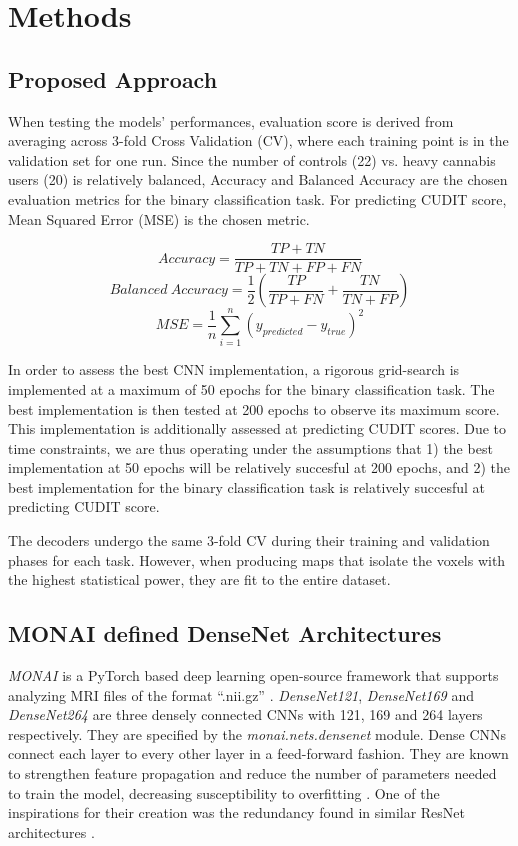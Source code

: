 \documentclass[conference]{IEEEtran}
\begin{document}
\section{Methods}

\subsection{Proposed Approach
}

When testing the models' performances, evaluation score is derived from averaging across 3-fold Cross Validation (CV), where each training point is in the validation set for one run. Since the number of controls (22) vs. heavy cannabis users (20) is relatively balanced, Accuracy and Balanced Accuracy are the chosen evaluation metrics for the binary classification task. For predicting CUDIT score, Mean Squared Error (MSE) is the chosen metric.

\[Accuracy = \frac{TP + TN}{TP + TN + FP + FN} \]
\[Balanced\ Accuracy = \frac{1}{2}(\frac{TP}{TP + FN} + \frac{TN}{TN + FP}) \]
\[MSE = \frac{1}{n}\sum_{i=1}^{n}(y_{predicted} - y_{true})^{2} \]

In order to assess the best CNN implementation, a rigorous grid-search is implemented at a maximum of 50 epochs for the binary classification task. The best implementation is then tested at 200 epochs to observe its maximum score. This implementation is additionally assessed at predicting CUDIT scores. Due to time constraints, we are thus operating under the assumptions that 1) the best implementation at 50 epochs will be relatively succesful at 200 epochs, and 2) the best implementation for the binary classification task is relatively succesful at predicting CUDIT score. 

The decoders undergo the same 3-fold CV during their training and validation phases for each task. However, when producing maps that isolate the voxels with the highest statistical power, they are fit to the entire dataset. 



\subsection{MONAI defined DenseNet Architectures}

\textit{MONAI} is a PyTorch based deep learning open-source framework that supports analyzing MRI files of the format “.nii.gz” \cite{MONAI}. \textit{DenseNet121}, \textit{DenseNet169} and \textit{DenseNet264} are three densely connected CNNs with 121, 169 and 264 layers respectively. They are specified by the \textit{monai.nets.densenet} module. Dense CNNs connect each layer to every other layer in a feed-forward fashion. They are known to strengthen feature propagation and reduce the number of parameters needed to train the model, decreasing susceptibility to overfitting \cite{Huang}. One of the inspirations for their creation was the redundancy found in similar ResNet architectures \cite{Huang}. 
\end{document}
